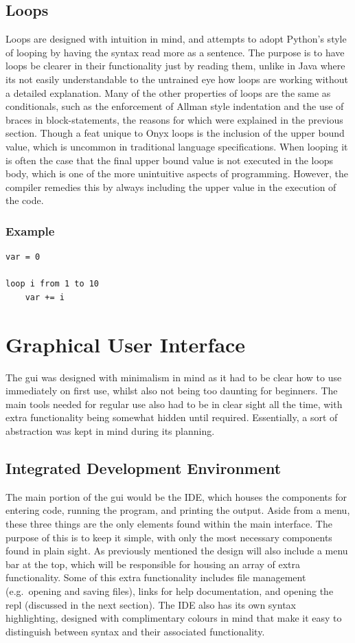 \documentclass[
]{report}
\begin{document}
\subsection{Loops}
Loops are designed with intuition in mind, and attempts to adopt
Python's style of looping by having the syntax read more as a sentence.
The purpose is to have loops be clearer in their functionality just by
reading them, unlike in Java where its not easily understandable to the
untrained eye how loops are working without a detailed explanation. Many
of the other properties of loops are the same as conditionals, such as
the enforcement of Allman style indentation and the use of braces in
\glspl{block-statement}, the reasons for which were explained in the previous
section. Though a feat unique to Onyx loops is the inclusion of the
upper bound value, which is uncommon in traditional language
specifications. When looping it is often the case that the final upper
bound value is not executed in the loops body, which is one of the more
unintuitive aspects of programming. However, the compiler remedies this
by always including the upper value in the execution of the code.

\subsubsection{Example}
\begin{verbatim}
var = 0

loop i from 1 to 10
    var += i
\end{verbatim}

\section{Graphical User Interface}
The \acrshort{gui} was designed with minimalism in mind as it had to be clear how
to use immediately on first use, whilst also not being too daunting for
beginners. The main tools needed for regular use also had to be in clear
sight all the time, with extra functionality being somewhat hidden until
required. Essentially, a sort of abstraction was kept in mind during its
planning.

\subsection{Integrated Development Environment}
The main portion of the \acrshort{gui} would be the IDE, which houses the
components for entering code, running the program, and printing the
output. Aside from a menu, these three things are the only elements
found within the main interface. The purpose of this is to keep it
simple, with only the most necessary components found in plain sight. As
previously mentioned the design will also include a menu bar at the top,
which will be responsible for housing an array of extra functionality.
Some of this extra functionality includes file management (e.g.~opening
and saving files), links for help documentation, and opening the \acrshort{repl}
(discussed in the next section). The IDE also has its own syntax
highlighting, designed with complimentary colours in mind that make it
easy to distinguish between syntax and their associated functionality.
\end{document}
